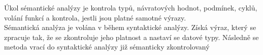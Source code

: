 \documentclass[../main.tex]{subfiles}
\begin{document}
    Úkol sémantické analýzy je kontrola typů, návratových hodnot, podmínek, cyklů, volání funkcí a kontrola, jestli jsou platné samotné výrazy. \\
    Sémantická analýza je volána v během syntaktické analýzy. Získá výraz, který se zpracuje tak, že se zkontroluje jeho platnost a nastaví se datové typy. Následně se metoda vrací do syntaktické analýzy již sémanticky zkontrolovaný
    \\
    

    
      
      
\end{document}
